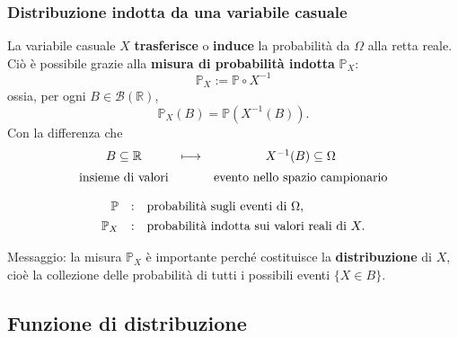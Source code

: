 \documentclass[handout]{beamer}%
\providecommand{\Prob}{\mathbb{P}}
\providecommand{\1}{\mathbf{1}}
\providecommand{\QTR}[2]{\csname #1\endcsname{#2}}
\begin{document}
\begin{frame}%
%

\frametitle{Distribuzione indotta da una variabile casuale}%


La variabile casuale $X$ \textbf{trasferisce} o \textbf{induce} la
probabilit\`{a} da $\Omega$ alla retta reale. Ci\`{o} \`{e} possibile grazie
alla \textbf{misura di probabilit\`{a} indotta} $\Prob_{X}$:
\[
\Prob_{X}:=\Prob\circ X^{-1}
\]
ossia, per ogni $B \in\mathcal{B}(\mathbb{R})$,
\[
\Prob_{X}(B) = \Prob\left( X^{-1}(B)\right) .
\]
Con la differenza che
\[%
\begin{array}
[c]{ccc}%
B\subseteq\mathbb{R} & \longmapsto & X^{-1}(B)\subseteq\Omega\\[5pt]%
\mbox{insieme di valori} &  & \mbox{evento nello spazio campionario}
\end{array}
\]
%

\[%
\begin{array}
[c]{rcl}%
\Prob & : & \mbox{probabilit\`{a} sugli eventi di } \Omega,\\[4pt]%
\Prob_{X} & : & \mbox{probabilit\`{a} indotta sui valori reali di } X.
\end{array}
\]


\medskip

Messaggio: la misura $\Prob_{X}$ \`{e} importante perch\'{e} costituisce la
\textbf{distribuzione} di $X$, cio\`{e} la collezione delle probabilit\`{a} di
tutti i possibili eventi $\{X\in B\}$.%

\transboxout
\end{frame}%




\subsection{Funzione di distribuzione}%
\end{document}
